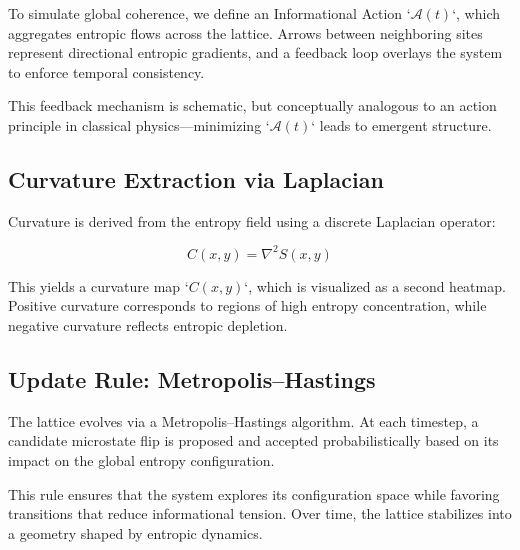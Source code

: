 \documentclass[12pt]{article}
\begin{document}
To simulate global coherence, we define an Informational Action `\( \mathcal{A}(t) \)`, which aggregates entropic flows across the lattice. Arrows between neighboring sites represent directional entropic gradients, and a feedback loop overlays the system to enforce temporal consistency.

This feedback mechanism is schematic, but conceptually analogous to an action principle in classical physics—minimizing `\( \mathcal{A}(t) \)` leads to emergent structure.

\subsection{Curvature Extraction via Laplacian}

Curvature is derived from the entropy field using a discrete Laplacian operator:

\begin{equation}
C(x, y) = \nabla^2 S(x, y)
\end{equation}

This yields a curvature map `\( C(x, y) \)`, which is visualized as a second heatmap. Positive curvature corresponds to regions of high entropy concentration, while negative curvature reflects entropic depletion.

\subsection{Update Rule: Metropolis–Hastings}

The lattice evolves via a Metropolis–Hastings algorithm. At each timestep, a candidate microstate flip is proposed and accepted probabilistically based on its impact on the global entropy configuration.

This rule ensures that the system explores its configuration space while favoring transitions that reduce informational tension. Over time, the lattice stabilizes into a geometry shaped by entropic dynamics.
\end{document}
